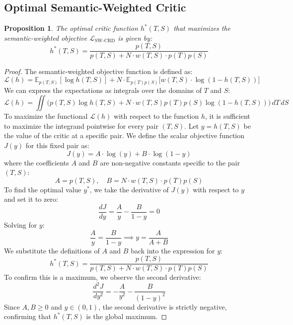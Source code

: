 \documentclass{article}
\theoremstyle{plain}
\newtheorem{proposition}{Proposition}
\theoremstyle{remark}
\begin{document}
\subsection{Optimal Semantic-Weighted Critic}

\begin{proposition}
  \label{prop:optimal-critic}
  The optimal critic function $h^*(T,S)$ that maximizes the semantic-weighted objective $\mathcal{L}_{\text{SW-CRD}}$ is given by:
  $$
  h^*(T,S) = \frac{p(T,S)}{p(T,S) + N \cdot w(T,S) \cdot p(T)p(S)}
  $$
\end{proposition}

\begin{proof}
    The semantic-weighted objective function is defined as:
    \begin{equation}
        \mathcal{L}(h) = \mathbb{E}_{p(T,S)}[\log h(T,S)] + N \cdot \mathbb{E}_{p(T)p(S)}\big[ w(T,S) \cdot \log(1 - h(T,S)) \big]
    \end{equation}
    We can express the expectations as integrals over the domains of $T$ and $S$:
    \begin{equation}
        \mathcal{L}(h) = \iint \Big( p(T,S) \log h(T,S) + N \cdot w(T,S) p(T)p(S) \log(1 - h(T,S)) \Big) \, dT \, dS
    \end{equation}
    To maximize the functional $\mathcal{L}(h)$ with respect to the function $h$, it is sufficient to maximize the integrand pointwise for every pair $(T,S)$. Let $y = h(T,S)$ be the value of the critic at a specific pair. We define the scalar objective function $J(y)$ for this fixed pair as:
    \begin{equation}
        J(y) = A \cdot \log(y) + B \cdot \log(1 - y)
    \end{equation}
    where the coefficients $A$ and $B$ are non-negative constants specific to the pair $(T,S)$:
    \begin{equation}
        A = p(T,S), \quad B = N \cdot w(T,S) \cdot p(T)p(S)
    \end{equation}
    To find the optimal value $y^*$, we take the derivative of $J(y)$ with respect to $y$ and set it to zero:
    \begin{equation}
        \frac{dJ}{dy} = \frac{A}{y} - \frac{B}{1 - y} = 0
    \end{equation}
    Solving for $y$:
    \begin{equation}
    \frac{A}{y} = \frac{B}{1 - y} 
    \implies
    y = \frac{A}{A + B}
    \end{equation}
    We substitute the definitions of $A$ and $B$ back into the expression for $y$:
    \begin{equation}
    h^*(T,S) = \frac{p(T,S)}{p(T,S) + N \cdot w(T,S) \cdot p(T)p(S)}
    \end{equation}
    To confirm this is a maximum, we observe the second derivative:
    \begin{equation}
    \frac{d^2J}{dy^2} = -\frac{A}{y^2} - \frac{B}{(1-y)^2}
    \end{equation}
    Since $A, B \ge 0$ and $y \in (0,1)$, the second derivative is strictly negative, confirming that $h^*(T,S)$ is the global maximum.
\end{proof}
\end{document}
